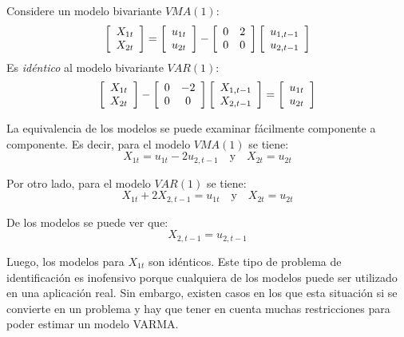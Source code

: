 \begin{ejemplo}
Considere un modelo bivariante $VMA(1)$:
\[
\left[ {\begin{array}{*{20}c}
X_{1t}\\
X_{2t}\\
\end{array} } \right]=\left[ {\begin{array}{*{20}c}
u_{1t}\\
u_{2t}\\
\end{array} } \right]-\left[ {\begin{array}{*{20}c}
0 & 2\\
0 & 0\\
\end{array} } \right]\left[ {\begin{array}{*{20}c}
u_{1,t-1}\\
u_{2,t-1}\\
\end{array} } \right]
\]
Es \textit{id\'{e}ntico} al modelo bivariante $VAR(1)$:
\[
\left[ {\begin{array}{*{20}c}
X_{1t}\\
X_{2t}\\
\end{array} } \right]-\left[ {\begin{array}{*{20}c}
0 & -2\\
0 & 0\\
\end{array} } \right]\left[ {\begin{array}{*{20}c}
X_{1,t-1}\\
X_{2,t-1}\\
\end{array} } \right]=\left[ {\begin{array}{*{20}c}
u_{1t}\\
u_{2t}\\
\end{array} } \right]
\]

La equivalencia de los modelos se puede examinar f\'{a}cilmente componente a componente. Es decir, para el modelo $VMA(1)$ se tiene:
\[
X_{1t}=u_{1t}-2u_{2,t-1}\quad \text{y}\quad X_{2t}=u_{2t}
\]

Por otro lado, para el modelo $VAR(1)$ se tiene:
\[
X_{1t}+2X_{2,t-1}=u_{1t}\quad \text{y}\quad X_{2t}=u_{2t}
\]

De los modelos se puede ver que:
\[
X_{2,t-1}=u_{2,t-1}
\]

Luego, los modelos para $X_{1t}$ son id\'{e}nticos. Este tipo de problema de identificaci\'{o}n es inofensivo porque cualquiera de los modelos puede ser utilizado en una aplicaci\'{o}n real. Sin embargo, existen casos en los que esta situaci\'{o}n si se convierte en un problema y hay que tener en cuenta muchas restricciones para poder estimar un modelo VARMA.
\end{ejemplo}


